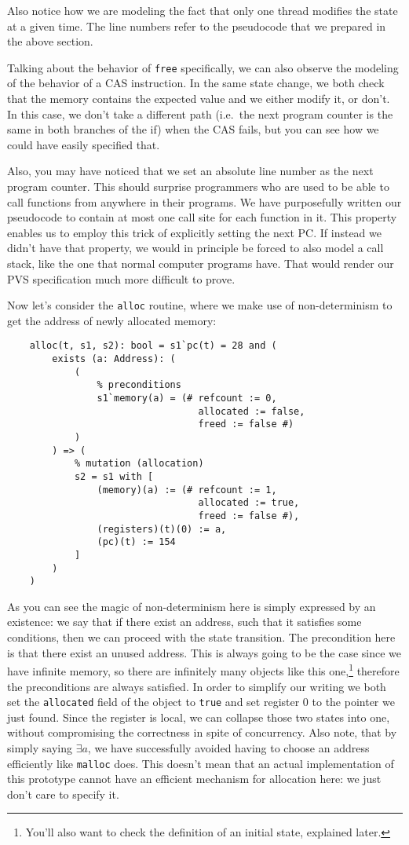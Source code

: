 Also notice how we are modeling the fact that only one thread modifies the state at a given time.
The line numbers refer to the pseudocode that we prepared in the above section.

Talking about the behavior of \texttt{free} specifically, we can also observe the modeling of the behavior of a CAS instruction.
In the same state change, we both check that the memory contains the expected value and we either modify it, or don't.
In this case, we don't take a different path (i.e.\ the next program counter is the same in both branches of the if) when the CAS fails, but you can see how we could have easily specified that.

Also, you may have noticed that we set an absolute line number as the next program counter.
This should surprise programmers who are used to be able to call functions from anywhere in their programs.
We have purposefully written our pseudocode to contain at most one call site for each function in it.
This property enables us to employ this trick of explicitly setting the next PC\@.
If instead we didn't have that property, we would in principle be forced to also model a call stack, like the one that normal computer programs have.
That would render our PVS specification much more difficult to prove.

Now let's consider the \texttt{alloc} routine, where we make use of non-deter\-minism to get the address of newly allocated memory:
\begin{verbatim}
	alloc(t, s1, s2): bool = s1`pc(t) = 28 and (
	    exists (a: Address): (
	        (
	            % preconditions
	            s1`memory(a) = (# refcount := 0,
	                              allocated := false,
	                              freed := false #)
	        )
	    ) => (
	        % mutation (allocation)
	        s2 = s1 with [
	            (memory)(a) := (# refcount := 1,
	                              allocated := true,
	                              freed := false #),
	            (registers)(t)(0) := a,
	            (pc)(t) := 154
	        ]
	    )
	)
\end{verbatim}

As you can see the magic of non-determinism here is simply expressed by an existence: we say that if there exist an address, such that it satisfies some conditions, then we can proceed with the state transition.
The precondition here is that there exist an unused address.
This is always going to be the case since we have infinite memory, so there are infinitely many objects like this one,\footnote{%
	You'll also want to check the definition of an initial state, explained later.
} therefore the preconditions are always satisfied.
In order to simplify our writing we both set the \texttt{allocated} field of the object to \texttt{true} and set register 0 to the pointer we just found.
Since the register is local, we can collapse those two states into one, without compromising the correctness in spite of concurrency.
Also note, that by simply saying $\exists a$, we have successfully avoided having to choose an address efficiently like \texttt{malloc} does.
This doesn't mean that an actual implementation of this prototype cannot have an efficient mechanism for allocation here: we just don't care to specify it.

